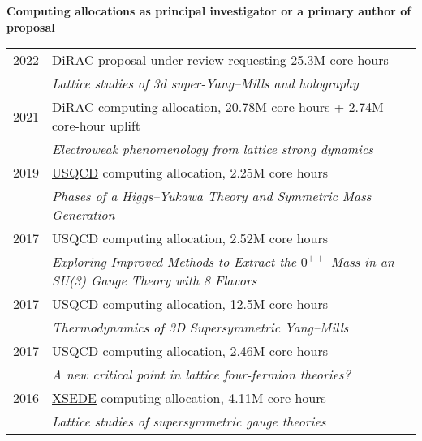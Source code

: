 \begin{spacelist}
  \vspace{18 pt}
  \item {\large \bfseries Computing allocations as principal investigator or a primary author of proposal} \\[10 pt]
    \begin{tabular}[t]{cl}
      2022 & \href{https://dirac.ac.uk}{DiRAC} proposal under review requesting 25.3M core hours                      \\ %
           & \textit{Lattice studies of 3d super-Yang--Mills and holography}                                          \\[6 pt]
      2021 & DiRAC computing allocation, 20.78M core hours + 2.74M core-hour uplift                                   \\ %
           & \textit{Electroweak phenomenology from lattice strong dynamics}                                          \\[6 pt]
      2019 & \href{http://www.usqcd.org}{USQCD} computing allocation, 2.25M core hours                                \\ %
           & \textit{Phases of a Higgs--Yukawa Theory and Symmetric Mass Generation}                                  \\[6 pt]
      2017 & USQCD computing allocation, 2.52M core hours                                                             \\ %
           & \textit{Exploring Improved Methods to Extract the $0^{++}$ Mass in an SU(3) Gauge Theory with 8 Flavors} \\[6 pt]
      2017 & USQCD computing allocation, 12.5M core hours                                                             \\ %
           & \textit{Thermodynamics of 3D Supersymmetric Yang--Mills}                                                 \\[6 pt]
      2017 & USQCD computing allocation, 2.46M core hours                                                             \\ %
           & \textit{A new critical point in lattice four-fermion theories?}                                          \\[6 pt]
      2016 & \href{http://www.xsede.org}{XSEDE} computing allocation, 4.11M core hours                                \\ %
           & \textit{Lattice studies of supersymmetric gauge theories}                                                \\[6 pt]

\end{tabular}
\end{spacelist}
